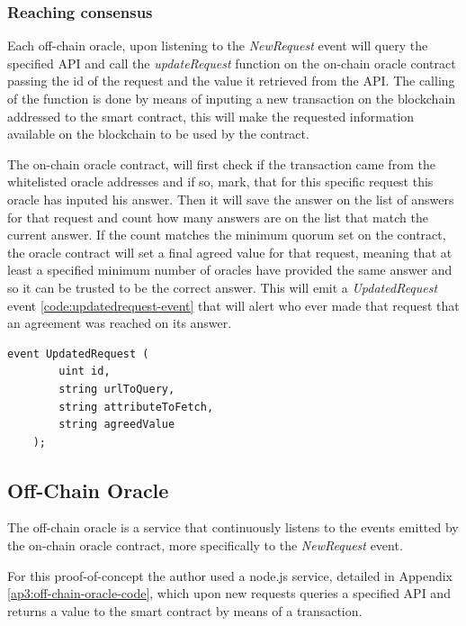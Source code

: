 \subsubsection{Reaching consensus}

Each off-chain oracle, upon listening to the \textit{NewRequest} event will query the specified API and call the \textit{updateRequest} function on the on-chain oracle contract passing the id of the request and the value it retrieved from the API. The calling of the function is done by means of inputing a new transaction on the blockchain addressed to the smart contract, this will make the requested information available on the blockchain to be used by the contract.

The on-chain oracle contract, will first check if the transaction came from the whitelisted oracle addresses and if so, mark, that for this specific request this oracle has inputed his answer. Then it will save the answer on the list of answers for that request and count how many answers are on the list that match the current answer. If the count matches the minimum quorum set on the contract, the oracle contract will set a final agreed value for that request, meaning that at least a specified minimum number of oracles have provided the same answer and so it can be trusted to be the correct answer. This will emit a \textit{UpdatedRequest} event \ref{code:updatedrequest-event} that will alert who ever made that request that an agreement was reached on its answer.


\begin{lstlisting}[language=Solidity, label=code:updatedrequest-event]
    event UpdatedRequest (
        uint id,
        string urlToQuery,
        string attributeToFetch,
        string agreedValue
    );
\end{lstlisting}


\subsection{Off-Chain Oracle}

The off-chain oracle is a service that continuously listens to the events emitted by the on-chain oracle contract, more specifically to the \textit{NewRequest} event.

For this proof-of-concept the author used a node.js service, detailed in Appendix \ref{ap3:off-chain-oracle-code}, which upon new requests queries a specified API and returns a value to the smart contract by means of a transaction.

